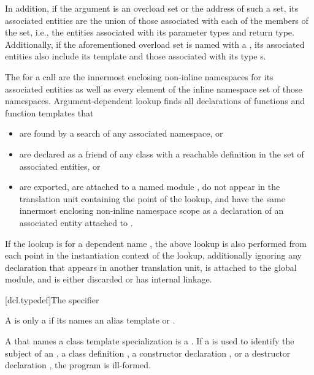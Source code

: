 \documentclass{wg21}
\begin{document}
In addition, if the argument is an overload set or the address of such a set,
its associated entities
are the union of those associated with each of the
members of the set, i.e., the entities associated with its
parameter types and return type.
Additionally, if the aforementioned overload set is named with
a , its associated entities also include
its template   and
those associated with its type s.

\pnum
The  for a call are
the innermost enclosing non-inline namespaces for its associated entities
as well as every element of the inline namespace set 
of those namespaces.
Argument-dependent lookup finds
all declarations of functions and function templates that
\begin{itemize}
    \item
    are found by a search of any associated namespace, or
    \item
    are declared as a friend  of any class
    with a reachable definition in the set of associated entities, or
    \item
    are exported,
    are attached to a named module  ,
    do not appear in the translation unit containing the point of the lookup, and
    have the same innermost enclosing non-inline namespace scope as
    a declaration of an associated entity attached to  .
\end{itemize}
If the lookup is for a dependent name ,
the above lookup is also performed
from each point in the instantiation context  of the lookup,
additionally ignoring any declaration that
appears in another translation unit,
is attached to the global module, and
is either discarded  or has internal linkage.

[dcl.typedef]{The  specifier}%


\pnum
{}%
A  is only a 
if its  names
an alias template or .
\begin{note}
    A  that names a class template specialization
    is a  .
    If a  is used to identify the subject of an
     , a class
    definition , a constructor
    declaration , or a destructor
    declaration , the program is ill-formed.
\end{note}
\end{document}
